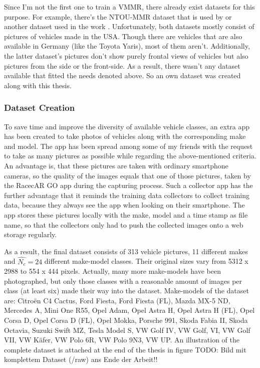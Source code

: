 Since I'm not the first one to train a VMMR, there already exist datasets for this purpose. For example, there's the NTOU-MMR dataset \citep{ntoummrDataset} that is used by \citep{siddiqui2016real} or another dataset used in the work \citep{krause20133d}. Unfortunately, both datasets mostly consist of pictures of vehicles made in the USA. Though there are vehicles that are also available in Germany (like the Toyota Yaris), most of them aren't. Additionally, the latter dataset's pictures don't show purely frontal views of vehicles but also pictures from the side or the front-side. As a result, there wasn't any dataset available that fitted the needs denoted above. So an own dataset was created along with this thesis.

\subsubsection{Dataset Creation}\label{sec:datasetCreation}
To save time and improve the diversity of available vehicle classes, an extra app has been created to take photos of vehicles along with the corresponding make and model. The app has been spread among some of my friends with the request to take as many pictures as possible while regarding the above-mentioned criteria. An advantage is, that these pictures are taken with ordinary smartphone cameras, so the quality of the images equals that one of those pictures, taken by the RacecAR GO app during the capturing process. Such a collector app has the further advantage that it reminds the training data collectors to collect training data, because they always see the app when looking on their smartphone. The app stores these pictures locally with the make, model and a time stamp as file name, so that the collectors only had to push the collected images onto a web storage regularly.

As a result, the final dataset consists of 313 vehicle pictures, 11 different makes and $\hat{N_c} = 24$ different make-model classes. Their original sizes vary from 5312 x 2988 to 554 x 444 pixels. Actually, many more make-models have been photographed, but only those classes with a reasonable amount of images per class (at least six) made their way into the dataset. Make-models of the dataset are: Citro\"en C4 Cactus, Ford Fiesta, Ford Fiesta (FL), Mazda MX-5 ND, Mercedes A, Mini One R55, Opel Adam, Opel Astra H, Opel Astra H (FL), Opel Corsa D, Opel Corsa D (FL), Opel Mokka, Porsche 991, Skoda Fabia II, Skoda Octavia, Suzuki Swift MZ, Tesla Model S, VW Golf IV, VW Golf, VI, VW Golf VII, VW K\"afer, VW Polo 6R, VW Polo 9N3, VW UP. An illustration of the complete dataset is attached at the end of the thesis in figure TODO: Bild mit komplettem Dataset (/raw) ans Ende der Arbeit!!

